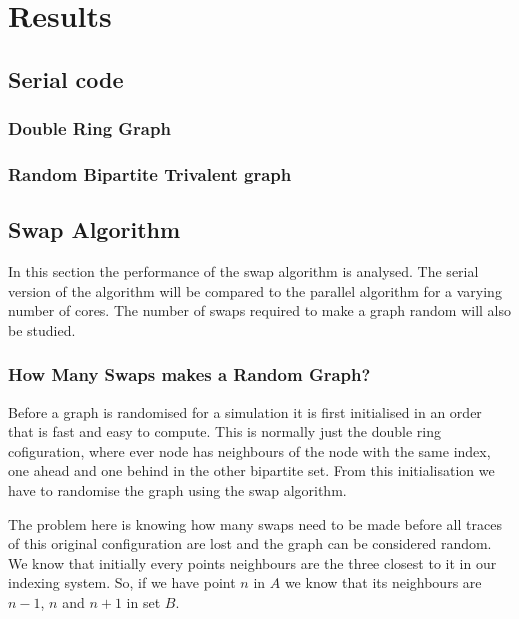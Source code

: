 \documentclass[pdftex,12pt,a4paper]{article}
\begin{document}



\newpage

\section{Results}

\subsection{Serial code}

\subsubsection{Double Ring Graph}

\subsubsection{Random Bipartite Trivalent graph}

\subsection{Swap Algorithm}

In this section the performance of the swap algorithm is analysed. The serial version of the algorithm will be compared to the parallel algorithm for a varying number of cores. The number of swaps required to make a graph random will also be studied.

\subsubsection{How Many Swaps makes a Random Graph?}

Before a graph is randomised for a simulation it is first initialised in an order that is fast and easy to compute. This is normally just the double ring cofiguration, where ever node has neighbours of the node with the same index, one ahead and one behind in the other bipartite set. From this initialisation we have to randomise the graph using the swap algorithm.

The problem here is knowing how many swaps need to be made before all traces of this original configuration are lost and the graph can be considered random. We know that initially every points neighbours are the three closest to it in our indexing system. So, if we have point $n$ in $A$ we know that its neighbours are $n-1$, $n$ and $n+1$ in set $B$.
\end{document}

